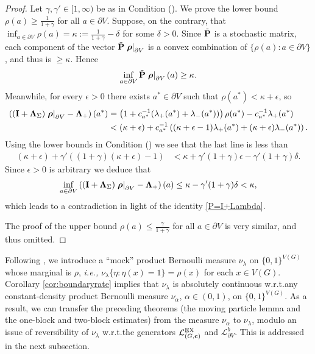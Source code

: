 \documentclass[11pt]{amsart}
\theoremstyle{plain}
\theoremstyle{definition}
\theoremstyle{remark}
\begin{document}
\begin{proof}
Let $\gamma, \gamma' \in [1,\infty)$ be as in Condition (). We prove the lower bound $\rho(a) \geq \frac{1}{1+\gamma}$ for all $a\in \partial V$. Suppose, on the contrary, that $\inf_{a\in\partial V} \rho(a) = \kappa :=\frac{1}{1+\gamma} - \delta$ for some $\delta>0$. Since $\tilde{\bf P}$ is a stochastic matrix,  each component of the vector $\tilde{\bf P} \left.\boldsymbol \rho\right|_{\partial V}$ is a convex combination of $\{\rho(a): a\in \partial V\}$, and thus is $\geq \kappa$. Hence
\[
\inf_{a\in \partial V} \tilde{\bf P} \left.\boldsymbol \rho\right|_{\partial V} (a) \geq \kappa. 
\]
Meanwhile, for every $\epsilon>0$ there exists $a^* \in \partial V$ such that $\rho(a^*) < \kappa +\epsilon$, so
\begin{align*}
\left(\left({\bf I} + \boldsymbol\Lambda_{\Sigma}\right) \left.\boldsymbol \rho\right|_{\partial V} - \boldsymbol\Lambda_+\right) (a^*) &= \left(1+ c_{a^*}^{-1} (\lambda_+(a^*) + \lambda_-(a^*))\right) \rho(a^*) - c_{a^*}^{-1} \lambda_+(a^*)\\
&< (\kappa+\epsilon) + c_{a^*}^{-1} \left((\kappa+\epsilon-1)\lambda_+(a^*) + (\kappa+\epsilon) \lambda_-(a^*) \right).
\end{align*}
Using the lower bounds in Condition () we see that the last line is less than
\begin{align*}
(\kappa+\epsilon) + \gamma' \left( (1+\gamma)(\kappa+\epsilon)-1\right) &< \kappa+\gamma'(1+\gamma)\epsilon -\gamma'(1+\gamma)\delta.
\end{align*}
Since $\epsilon>0$ is arbitrary we deduce that 
\[
\inf_{a\in \partial V}\left(\left({\bf I} + \boldsymbol\Lambda_{\Sigma}\right) \left.\boldsymbol \rho\right|_{\partial V} - \boldsymbol\Lambda_+\right) (a) \leq \kappa-\gamma'(1+\gamma)\delta < \kappa,
\]
which leads to a contradiction in light of the identity \eqref{P=I+Lambda}.

The proof of the upper bound $\rho(a) \leq \frac{\gamma}{1+\gamma}$ for all $a\in \partial V$ is very similar, and thus omitted.
\end{proof}

Following \cite{BDGJL03}, we introduce a ``mock'' product Bernoulli measure $\nu_\lambda$ on $\{0,1\}^{V(G)}$ whose marginal is $\rho$, \emph{i.e.,} $\nu_\lambda\{\eta: \eta(x)=1\} = \rho(x)$ for each $x\in V(G)$. Corollary \ref{cor:boundaryrate} implies that $\nu_\lambda$ is absolutely continuous w.r.t.\@ any constant-density product Bernoulli measure $\nu_\alpha$, $\alpha\in (0,1)$, on $\{0,1\}^{V(G)}$. As a result, we can transfer the preceding theorems (the moving particle lemma and the one-block and two-block estimates) from the measure $\nu_\alpha$ to $\nu_\lambda$, modulo an issue of reversibility of $\nu_\lambda$ w.r.t.\@ the generators $\mathcal{L}^{\rm EX}_{(G,{\bf c})}$ and $\mathcal{L}^{b}_{\partial V}$. This is addressed in the next subsection.
\end{document}
